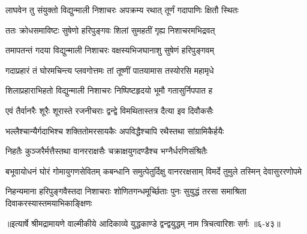 \twolineshloka
{लाघवेन तु संयुक्तो विद्युन्माली निशाचरः}
{अपक्रम्य रथात् तूर्णं गदापाणिः क्षितौ स्थितः} %

\twolineshloka
{ततः क्रोधसमाविष्टः सुषेणो हरिपुङ्गवः}
{शिलां सुमहतीं गृह्य निशाचरमभिद्रवत्} %

\twolineshloka
{तमापतन्तं गदया विद्युन्माली निशाचरः}
{वक्षस्यभिजघानाशु सुषेणं हरिपुङ्गवम्} %

\twolineshloka
{गदाप्रहारं तं घोरमचिन्त्य प्लवगोत्तमः}
{तां तूष्णीं पातयामास तस्योरसि महामृधे} %

\twolineshloka
{शिलाप्रहाराभिहतो विद्युन्माली निशाचरः}
{निष्पिष्टहृदयो भूमौ गतासुर्निपपात ह} %

\twolineshloka
{एवं तैर्वानरैः शूरैः शूरास्ते रजनीचराः}
{द्वन्द्वे विमथितास्तत्र दैत्या इव दिवौकसैः} %

\twolineshloka
{भल्लैश्चान्यैर्गदाभिश्च शक्तितोमरसायकैः}
{अपविद्धैश्चापि रथैस्तथा सांग्रामिकैर्हयैः} %

\twolineshloka
{निहतैः कुञ्जरैर्मत्तैस्तथा वानरराक्षसैः}
{चक्राक्षयुगदण्डैश्च भग्नैर्धरणिसंश्रितैः} %

\threelineshloka
{बभूवायोधनं घोरं गोमायुगणसेवितम्}
{कबन्धानि समुत्पेतुर्दिक्षु वानररक्षसाम्}
{विमर्दे तुमुले तस्मिन् देवासुररणोपमे} %

\twolineshloka
{निहन्यमाना हरिपुङ्गवैस्तदा निशाचराः शोणितगन्धमूर्च्छिताः}
{पुनः सुयुद्धं तरसा समाश्रिता दिवाकरस्यास्तमयाभिकाङ्क्षिणः} %


॥इत्यार्षे श्रीमद्रामायणे वाल्मीकीये आदिकाव्ये युद्धकाण्डे द्वन्द्वयुद्धम् नाम त्रिचत्वारिशः सर्गः ॥६-४३॥
